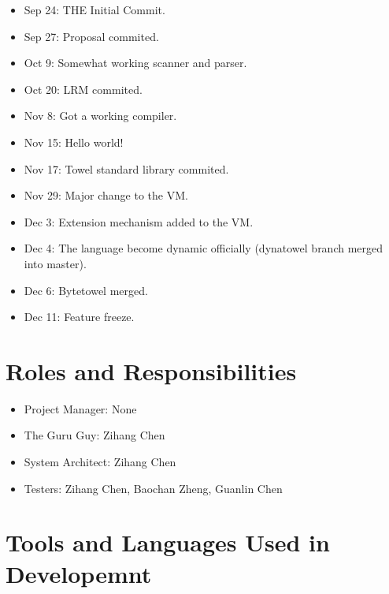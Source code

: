 \documentclass{report}
\begin{document}
\begin{itemize}
\item Sep 24: THE Initial Commit.
\item Sep 27: Proposal commited.
\item Oct 9: Somewhat working scanner and parser.
\item Oct 20: LRM commited.
\item Nov 8: Got a working compiler.
\item Nov 15: Hello world!
\item Nov 17: Towel standard library commited.
\item Nov 29: Major change to the VM.
\item Dec 3: Extension mechanism added to the VM.
\item Dec 4: The language become dynamic officially (dynatowel branch merged into master).
\item Dec 6: Bytetowel merged.
\item Dec 11: Feature freeze.
\end{itemize}

\section{Roles and Responsibilities}

\begin{itemize}
\item Project Manager: None
\item The Guru Guy: Zihang Chen
\item System Architect: Zihang Chen
\item Testers: Zihang Chen, Baochan Zheng, Guanlin Chen
\end{itemize}

\section{Tools and Languages Used in Developemnt}
\end{document}
